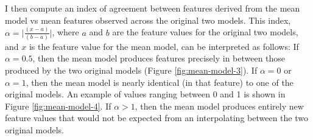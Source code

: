 
I then compute an index of agreement between features derived from the mean model vs mean features observed across the original two models.
This index, $\alpha=\lvert\frac{(x-a)}{(b-a)}\rvert$, where $a$ and $b$ are the feature values for the original two models, and $x$ is the feature value for the mean model, can be interpreted as follows:
If $\alpha=0.5$, then the mean model produces features precisely in between those produced by the two original models (Figure \ref{fig:mean-model-3}).
If $\alpha=0$ or $\alpha=1$, then the mean model is nearly identical (in that feature) to one of the original models.
An example of values ranging between 0 and 1 is shown in Figure \ref{fig:mean-model-4}.
If $\alpha>1$, then the mean model produces entirely new feature values that would not be expected from an interpolating between the two original models.

